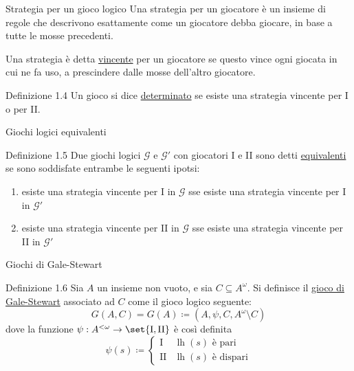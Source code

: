 \documentclass[babel]{beamer}
\renewcommand{\href}[2]{#2}
\begin{document}
\begin{frame}[label={sec:org153fabe}]{Strategia per un gioco logico}
Una strategia per un giocatore è un insieme di regole che descrivono esattamente come un giocatore debba giocare, in base a tutte le mosse precedenti.

Una strategia è detta \uline{vincente} per un giocatore se questo vince ogni giocata in cui ne fa uso, a prescindere dalle mosse dell'altro giocatore.
\begin{block}{Definizione 1.4}
Un gioco si dice \uline{determinato} se esiste una strategia vincente per I o per II.
\end{block}
\end{frame}
\begin{frame}[label={sec:org9e4f6d2}]{Giochi logici equivalenti}
\begin{block}{Definizione 1.5}
Due \href{../../../../../../../org/roam/20250513155732-logic_game.org}{giochi logici} \(\mathcal{G}\) e \(\mathcal{G'}\) con giocatori I e II sono detti \uline{equivalenti} se sono soddisfate entrambe le seguenti ipotsi:
\begin{enumerate}
\item esiste una \href{../../../../../../../org/roam/20250513155732-logic_game.org}{strategia vincente} per I in \(\mathcal{G}\) sse esiste una \href{../../../../../../../org/roam/20250513155732-logic_game.org}{strategia vincente} per I in \(\mathcal{G}'\)
\item esiste una \href{../../../../../../../org/roam/20250513155732-logic_game.org}{strategia vincente} per II in \(\mathcal{G}\) sse esiste una \href{../../../../../../../org/roam/20250513155732-logic_game.org}{strategia vincente} per II in \(\mathcal{G}'\)
\end{enumerate}
\end{block}
\end{frame}
\begin{frame}[label={sec:org4cc428c}]{Giochi di Gale-Stewart}
\begin{block}{Definizione 1.6}
Sia \(A\) un \href{../../../../../../../org/roam/20250130104331-insieme_mk.org}{insieme} non vuoto, e sia \(C \subseteq A^{\omega}\). Si definisce il \uline{gioco di Gale-Stewart} associato ad \(C\) come il \href{../../../../../../../org/roam/20250513155732-logic_game.org}{gioco logico} seguente:
\begin{equation*}
G(A,C) = G(A) \coloneqq (A, \psi, C, A^{\omega}\setminus C)
\end{equation*}
dove la \href{../../../../../../../org/roam/20250202170607-classe_relazione_binaria.org}{funzione} \(\psi: A^{<\omega}\to \set{\text{I},\text{II}}\) è così definita
\begin{equation*}
\psi(s) \coloneqq \begin{cases}
\text{I} & \operatorname{lh}(s)\text{ è pari}\\
\text{II} & \operatorname{lh}(s)\text{ è dispari}
\end{cases}
\end{equation*}
\end{block}
\end{frame}
\end{document}
